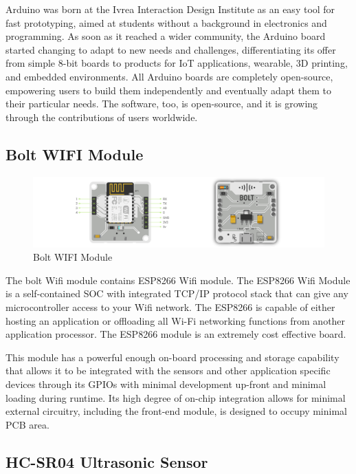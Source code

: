 Arduino was born at the Ivrea Interaction Design Institute as an easy tool for fast prototyping, aimed at students without a background in electronics and programming. As soon as it reached a wider community, the Arduino board started changing to adapt to new needs and challenges, differentiating its offer from simple 8-bit boards to products for IoT applications, wearable, 3D printing, and embedded environments. All Arduino boards are completely open-source, empowering users to build them independently and eventually adapt them to their particular needs. The software, too, is open-source, and it is growing through the contributions of users worldwide.
 
 
\newpage
\subsection{Bolt WIFI Module} 

	\begin{figure}[h]
		\centering
	\includegraphics[width=120mm,scale=1]{42}
	\caption{Bolt WIFI Module}
	\label{Bolt WIFI Module}
	
\end{figure}

 The bolt Wifi module contains ESP8266 Wifi module. The ESP8266 Wifi Module is a self-contained SOC with integrated TCP/IP protocol stack that can give any microcontroller access to your Wifi network. The ESP8266 is capable of either hosting an application or offloading all Wi-Fi networking functions from another application processor. The ESP8266 module is an extremely cost effective board. 
 
 This module has a powerful enough on-board processing and storage capability that allows it to be integrated with the sensors and other application specific devices through its GPIOs with minimal development up-front and minimal loading during runtime. Its high degree of on-chip integration allows for minimal external circuitry, including the front-end module, is designed to occupy minimal PCB area.
 
\newpage
\subsection{HC-SR04 Ultrasonic Sensor}
 
